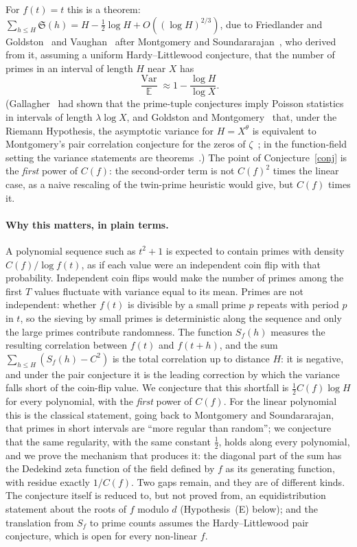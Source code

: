 \documentclass[11pt,a4paper]{article}
\theoremstyle{remark}\newtheorem{remark}[theorem]{Remark}
\newcommand{\Var}{\operatorname{Var}}
\newcommand{\E}{\mathbb{E}}
\newcommand{\Sig}{\mathfrak S}
\begin{document}
For $f(t)=t$ this is a theorem: $\sum_{h\le H}\Sig(h)=H-\tfrac12\log H+O((\log H)^{2/3})$, due to
Friedlander and Goldston~\cite{FriedlanderGoldston1995} and Vaughan~\cite{Vaughan2001} after
Montgomery and Soundararajan~\cite{MontgomerySoundararajan2004}, who derived from it, assuming a
uniform Hardy--Littlewood conjecture, that the number of primes in an interval of length $H$ near $X$
has
\begin{equation}\label{eq:MS}
\frac{\Var}{\E}\approx 1-\frac{\log H}{\log X}.
\end{equation}
(Gallagher~\cite{Gallagher1976} had shown that the prime-tuple conjectures imply Poisson statistics in
intervals of length $\lambda\log X$, and Goldston and Montgomery~\cite{GoldstonMontgomery1987} that,
under the Riemann Hypothesis, the asymptotic variance for $H=X^\theta$ is equivalent to Montgomery's
pair correlation conjecture for the zeros of $\zeta$~\cite{Montgomery1973}; in the function-field setting
the variance statements are theorems~\cite{KeatingRudnick2014}.) The point of Conjecture~\ref{conj} is
the \emph{first} power of $C(f)$: the second-order term is not $C(f)^2$ times the linear case, as a
naive rescaling of the twin-prime heuristic would give, but $C(f)$ times it.

\paragraph{Why this matters, in plain terms.} A polynomial sequence such as $t^2+1$ is expected to
contain primes with density $C(f)/\log f(t)$, as if each value were an independent coin flip with that
probability. Independent coin flips would make the number of primes among the first $T$ values fluctuate
with variance equal to its mean. Primes are not independent: whether $f(t)$ is divisible by a small prime
$p$ repeats with period $p$ in $t$, so the sieving by small primes is deterministic along the sequence and
only the large primes contribute randomness. The function $S_f(h)$ measures the resulting correlation
between $f(t)$ and $f(t+h)$, and the sum $\sum_{h\le H}(S_f(h)-C^2)$ is the total correlation up to
distance $H$: it is negative, and under the pair conjecture it is the leading correction by which the
variance falls short of the coin-flip value. We conjecture that this shortfall is $\tfrac12C(f)\log H$ for
every polynomial, with the \emph{first} power of $C(f)$. For the linear polynomial this is the classical
statement, going back to Montgomery and Soundararajan, that primes in short intervals are ``more regular
than random''; we conjecture that the same regularity, with the same constant $\tfrac12$, holds along every
polynomial, and we prove the mechanism that produces it: the diagonal part of the sum has the Dedekind
zeta function of the field defined by $f$ as its generating function, with residue exactly $1/C(f)$. Two
gaps remain, and they are of different kinds. The conjecture itself is reduced to, but not proved from, an
equidistribution statement about the roots of $f$ modulo $d$ (Hypothesis~(E) below); and the translation
from $S_f$ to prime counts assumes the Hardy--Littlewood pair conjecture, which is open for every
non-linear $f$.
\end{document}
